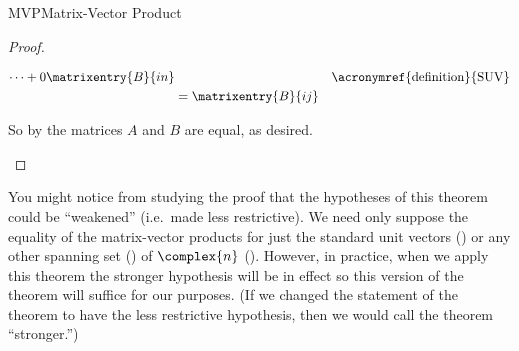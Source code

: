 \begin{subsect}{MVP}{Matrix-Vector Product}
\begin{proof}
\begin{para}
\begin{align*}
\cdots+
0\matrixentry{B}{in}
&&\text{\acronymref{definition}{SUV}}\\
%
&=\matrixentry{B}{ij}
%
\end{align*}\end{para}
%
\begin{para}So by  the matrices $A$ and $B$ are equal, as desired.\end{para}
%
\end{proof}
%
\begin{para}You might notice from studying the proof that the hypotheses of this theorem could be ``weakened'' (i.e.\  made less restrictive).   We need only suppose the equality of the matrix-vector products for just the standard unit vectors () or any other spanning set () of $\complex{n}$ ().  However, in practice, when we apply this theorem the stronger hypothesis will be in effect so this version of the theorem will suffice for our purposes.  (If we changed the statement of the theorem to have the less restrictive hypothesis, then we would call the theorem ``stronger.'')\end{para}
%
%
\end{subsect}
%
